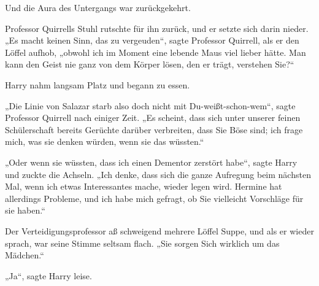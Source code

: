 Und die Aura des Untergangs war zurückgekehrt.

Professor Quirrells Stuhl rutschte für ihn zurück, und er setzte sich darin nieder. „Es macht keinen Sinn, das zu vergeuden“, sagte Professor Quirrell, als er den Löffel aufhob, „obwohl ich im Moment eine lebende Maus viel lieber hätte. Man kann den Geist nie ganz von dem Körper lösen, den er trägt, verstehen Sie?“

Harry nahm langsam Platz und begann zu essen.

\later

„Die Linie von Salazar starb also doch nicht mit Du-weißt-schon-wem“, sagte Professor Quirrell nach einiger Zeit. „Es scheint, dass sich unter unserer feinen Schülerschaft bereits Gerüchte darüber verbreiten, dass Sie Böse sind; ich frage mich, was sie denken würden, wenn sie das wüssten.“

„Oder wenn sie wüssten, dass ich einen Dementor zerstört habe“, sagte Harry und zuckte die Achseln. „Ich denke, dass sich die ganze Aufregung beim nächsten Mal, wenn ich etwas Interessantes mache, wieder legen wird. Hermine hat allerdings Probleme, und ich habe mich gefragt, ob Sie vielleicht Vorschläge für sie haben.“

Der Verteidigungsprofessor aß schweigend mehrere Löffel Suppe, und als er wieder sprach, war seine Stimme seltsam flach. „Sie sorgen Sich wirklich um das Mädchen.“

„Ja“, sagte Harry leise.

